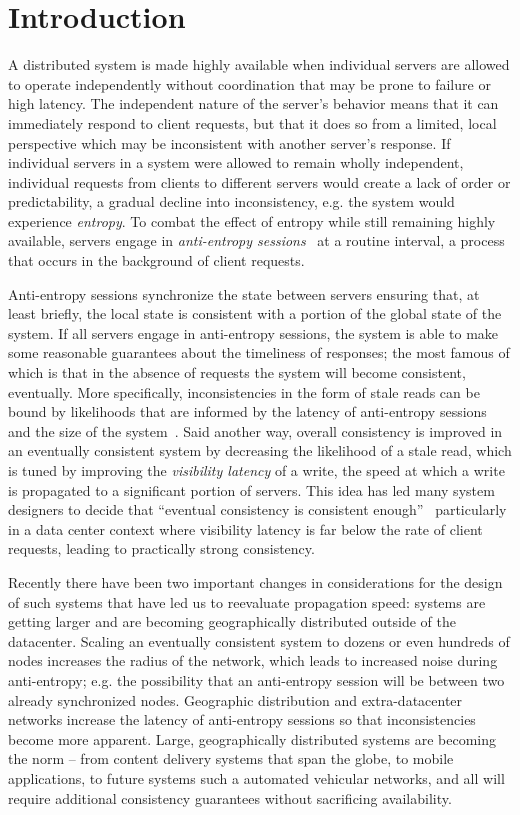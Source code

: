 \section*{Introduction}

A distributed system is made highly available when individual servers are
allowed to operate independently without coordination that may be prone to
failure or high latency.
The independent nature of the server's behavior means that it can immediately
respond to client requests, but that it does so from a limited, local
perspective which may be inconsistent with another server's response.
If individual servers in a system were allowed to remain wholly independent,
individual requests from clients to different servers would create a lack of
order or predictability, a gradual decline into inconsistency, e.g. the
system would experience \textit{entropy}.
To combat the effect of entropy while still remaining highly available,
servers engage in \textit{anti-entropy sessions}~\cite{terry_session_1994} at
a routine interval, a process that occurs in the background of client
requests.

Anti-entropy sessions synchronize the state between servers ensuring that,
at least briefly, the local state is consistent with a portion of the global
state of the system.
If all servers engage in anti-entropy sessions, the system is able to make
some reasonable guarantees about the timeliness of responses; the most famous
of which is that in the absence of requests the system will become
consistent, eventually.
More specifically, inconsistencies in the form of stale reads can be bound by
likelihoods that are informed by the latency of anti-entropy sessions and the
size of the system~\cite{bailis_quantifying_2014}.
Said another way, overall consistency is improved in an eventually consistent
system by decreasing the likelihood of a stale read, which is tuned by
improving the \textit{visibility latency} of a write, the speed at which a
write is propagated to a significant portion of servers.
This idea has led many system designers to decide that ``eventual consistency
is consistent enough''~\cite{bermbach_eventual_2011,wada2011data}
particularly in a data center context where visibility latency is far below
the rate of client requests, leading to practically strong consistency.

Recently there have been two important changes in considerations for the
design of such systems that have led us to reevaluate propagation speed:
systems are getting larger and are becoming geographically distributed
outside of the datacenter.
Scaling an eventually consistent system to dozens or even hundreds of nodes
increases the radius of the network, which leads to increased noise during
anti-entropy; e.g. the possibility that an anti-entropy session will be
between two already synchronized nodes.
Geographic distribution and extra-datacenter networks increase the latency of
anti-entropy sessions so that inconsistencies become more apparent.
Large, geographically distributed systems are becoming the norm -- from
content delivery systems that span the globe, to mobile applications, to
future systems such a automated vehicular networks, and all will require
additional consistency guarantees without sacrificing availability.

